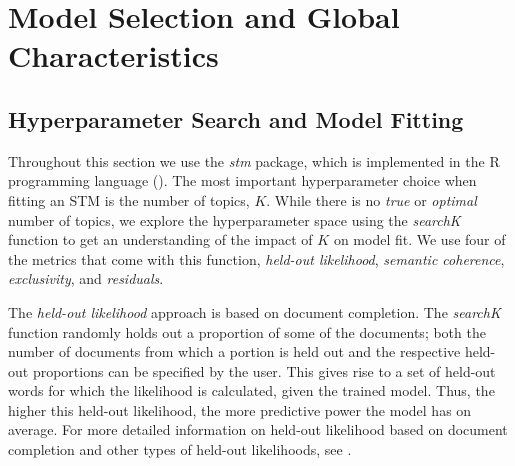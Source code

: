 \section{Model Selection and Global Characteristics}
\label{Model Selection and Global Characteristics}

\subsection{Hyperparameter Search and Model Fitting}
\label{Hyperparameter Search and Model Fitting}

Throughout this section we use the \textit{stm} package, which is implemented in the R programming language (\citealp{stm}). The most important hyperparameter choice when fitting an STM is the number of topics, $K$. While there is no \textit{true} or \textit{optimal} number of topics, we explore the hyperparameter space using the \textit{searchK} function to get an understanding of the impact of $K$ on model fit. We use four of the metrics that come with this function, \textit{held-out likelihood}, \textit{semantic coherence}, \textit{exclusivity}, and \textit{residuals}.

The \textit{held-out likelihood} approach is based on document completion. The \textit{searchK} function randomly holds out a proportion of some of the documents; both the number of documents from which a portion is held out and the respective held-out proportions can be specified by the user. This gives rise to a set of held-out words for which the likelihood is calculated, given the trained model. Thus, the higher this held-out likelihood, the more predictive power the model has on average. For more detailed information on held-out likelihood based on document completion and other types of held-out likelihoods, see \cite{wallach2009evaluation}.

